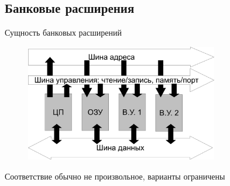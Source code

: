 \documentclass[xetex,aspectratio=43]{beamer}
\begin{document}
\subsection{Банковые расширения}

\begin{frame}{Сущность банковых расширений}
        \begin{figure}
            \includegraphics[page=2, width=0.75\textwidth]{img/06.Mem_Models-crop.pdf}
        \end{figure}


        Соответствие обычно не произвольное, варианты ограничены
\end{frame}
\end{document}
